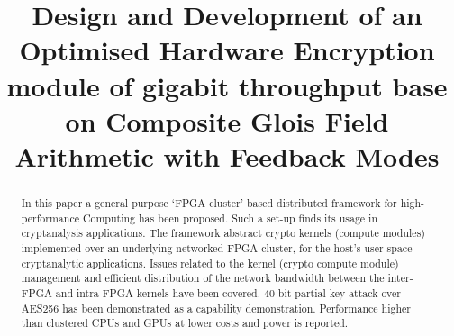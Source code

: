 \documentclass[10pt, conference, compsocconf]{IEEEtran}
\begin{document}
\title{Design and Development of an Optimised Hardware Encryption module of gigabit throughput base on Composite Glois Field Arithmetic with Feedback Modes}


\author{
\and
{}
}


\maketitle


\begin{abstract}

In this paper a general purpose `FPGA cluster' based distributed framework for high-performance Computing has been proposed. Such a set-up finds its usage in cryptanalysis applications. The framework abstract crypto kernels (compute modules) implemented over an underlying networked FPGA cluster, for the host's user-space cryptanalytic applications. Issues related to the kernel (crypto compute module) management and efficient distribution of the network bandwidth between the inter-FPGA and intra-FPGA kernels have been covered. 40-bit partial key attack over AES256 has been demonstrated as a capability demonstration. Performance higher than clustered CPUs and GPUs at lower costs and power is reported.

\end{abstract}
\end{document}
